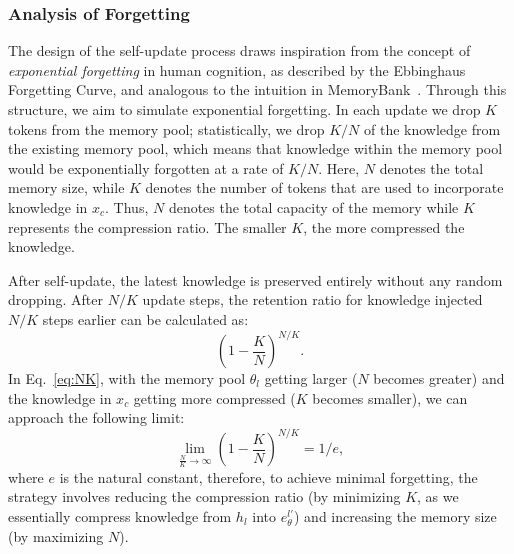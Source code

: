\subsubsection{Analysis of Forgetting}
\label{sec:aof}
The design of the self-update process draws inspiration from the concept of \textit{exponential forgetting} in human cognition, as described by the Ebbinghaus Forgetting Curve, and analogous to the intuition in MemoryBank~\citep{MemoryBank}. 
Through this structure, we aim to simulate exponential forgetting. In each update we drop $K$ tokens from the memory pool; statistically, we drop $K/N$ of the knowledge from the existing memory pool, which means that knowledge within the memory pool would be exponentially forgotten at a rate of $K/N$. 
Here, $N$ denotes the total memory size, while $K$ denotes the number of tokens that are used to incorporate knowledge in $x_c$. Thus, $N$ denotes the total capacity of the memory while $K$ represents the compression ratio. The smaller $K$, the more compressed the knowledge. 

After self-update, the latest knowledge is preserved entirely without any random dropping. After $N/K$ update steps, the retention ratio for knowledge injected $N/K$ steps earlier can be calculated as:
\begin{equation}\label{eq:NK}
    (1 - \frac{K}{N})^{N/K}.
\end{equation}
In Eq.~\ref{eq:NK}, with the memory pool $\theta_l$ getting larger ($N$ becomes greater) and the knowledge in $x_c$ getting more compressed ($K$ becomes smaller), we can approach the following limit: 
\begin{equation}\label{eq:NK_limit}
    \lim_{\frac{N}{K}\rightarrow \infty} (1 - \frac{K}{N})^{N/K} = 1/e,
\end{equation}
where $e$ is the natural constant, therefore, to achieve minimal forgetting, the strategy involves reducing the compression ratio (by minimizing $K$, as we essentially compress knowledge from $h_l$ into $e_\theta^{l'}$) and increasing the memory size (by maximizing $N$).

